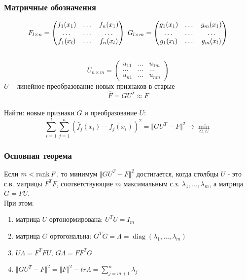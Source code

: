 \documentclass[10pt]{beamer}
\begin{document}
\begin{frame}\frametitle{Матричные обозначения}
	$$F_{l \times n} = \begin{pmatrix}
	  f_1(x_1) & \dots & f_n(x_1) \\
	  \dots & \dots & \dots\\
	  f_1(x_l) & \dots & f_n(x_l)
	 \end{pmatrix} \hspace{1mm} G_{l \times m} = \begin{pmatrix}
	  g_1(x_1) & \dots & g_m(x_1) \\
	  \dots & \dots & \dots\\
	  g_1(x_l) & \dots & g_m(x_l)
	 \end{pmatrix}$$\\
	 $$U_{n \times m} = \begin{pmatrix}
	  u_{11} & \dots & u_{1m} \\
	  \dots & \dots & \dots\\
	  u_{n1} & \dots & u_{nm}
	 \end{pmatrix}$$
	$U$ -- линейное преобразование новых признаков в старые\\
	$$\hat{F} = GU^T \approx F$$\\
	Найти: новые признаки $G$ и преобразование $U$:\\
	$$\sum\limits_{i=1}^l \sum\limits_{j=1}^n (\hat{f}_j(x_i) - f_j(x_i))^2 = \Vert GU^T - F \Vert^2 \rightarrow \min\limits_{G, U}$$
\end{frame}

\begin{frame}\frametitle{Основная теорема}
	Если $m < \operatorname{rank} F$, то минимум $\Vert GU^T - F \Vert^2$ достигается, когда столбцы $U$ - это с.в. матрицы $F^TF$, соответствующие $m$ максимальным с.з. $\lambda_1,\dots, \lambda_m$, а матрица $G = FU$.\\
	\bigbreak
	При этом:\\
	\begin{enumerate}[--]
		\item матрица $U$ ортонормирована: $U^TU = I_m$
		\item матрица $G$ ортогональна: $G^TG = \Lambda = \operatorname{diag}(\lambda_1, \dots, \lambda_m)$
		\item $U\Lambda = F^TFU$,  $G\Lambda = FF^TG$
		\item $\Vert GU^T - F \Vert^2 = \Vert F \Vert^2 - tr \Lambda = \sum\limits_{j=m+1}^n \lambda_j$
	\end{enumerate}
\end{frame}
\end{document}
